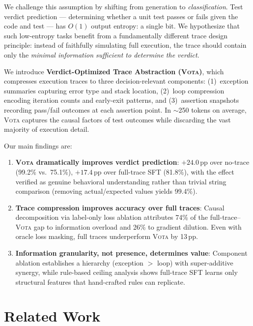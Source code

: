 \documentclass[11pt,a4paper]{article}
\newcommand{\vota}{\textsc{Vota}}
\newcommand{\pp}{\,\text{pp}}
\begin{document}
We challenge this assumption by shifting from generation to \emph{classification}.
Test verdict prediction --- determining whether a unit test passes or fails given the code and test --- has $O(1)$ output entropy: a single bit.
We hypothesize that such low-entropy tasks benefit from a fundamentally different trace design principle: instead of faithfully simulating full execution, the trace should contain only the \emph{minimal information sufficient to determine the verdict}.

We introduce \textbf{Verdict-Optimized Trace Abstraction (\vota{})}, which compresses execution traces to three decision-relevant components: (1)~exception summaries capturing error type and stack location, (2)~loop compression encoding iteration counts and early-exit patterns, and (3)~assertion snapshots recording pass/fail outcomes at each assertion point.
In $\sim$250 tokens on average, \vota{} captures the causal factors of test outcomes while discarding the vast majority of execution detail.

Our main findings are:
\begin{enumerate}
\item \textbf{\vota{} dramatically improves verdict prediction}: $+24.0\pp$ over no-trace (99.2\% vs.\ 75.1\%), $+17.4\pp$ over full-trace SFT (81.8\%), with the effect verified as genuine behavioral understanding rather than trivial string comparison (removing actual/expected values yields 99.4\%).
\item \textbf{Trace compression improves accuracy over full traces}: Causal decomposition via label-only loss ablation attributes 74\% of the full-trace--\vota{} gap to information overload and 26\% to gradient dilution. Even with oracle loss masking, full traces underperform \vota{} by 13$\pp$.
\item \textbf{Information granularity, not presence, determines value}: Component ablation establishes a hierarchy (exception $>$ loop) with super-additive synergy, while rule-based ceiling analysis shows full-trace SFT learns only structural features that hand-crafted rules can replicate.
\end{enumerate}

\section{Related Work}
\label{sec:related}
\end{document}
